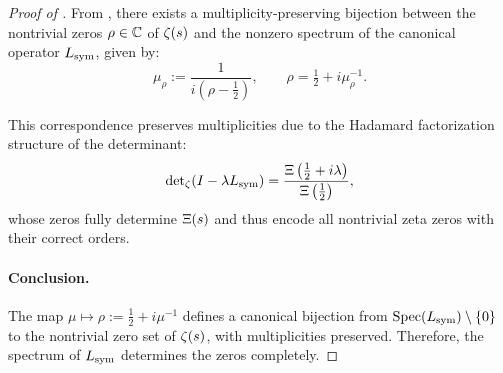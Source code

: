 \begin{proof}[Proof of ]
From , there exists a multiplicity-preserving bijection between the nontrivial zeros \( \rho \in \mathbb{C} \) of \( \zeta(s) \) and the nonzero spectrum of the canonical operator \( L_{\mathrm{sym}} \), given by:
\[
\mu_\rho := \frac{1}{i(\rho - \tfrac{1}{2})}, \qquad
\rho = \tfrac{1}{2} + i \mu_\rho^{-1}.
\]

This correspondence preserves multiplicities due to the Hadamard factorization structure of the determinant:
\[
\det\nolimits_\zeta(I - \lambda L_{\mathrm{sym}}) = \frac{\Xi\left( \tfrac{1}{2} + i\lambda \right)}{\Xi\left( \tfrac{1}{2} \right)},
\]
whose zeros fully determine \( \Xi(s) \) and thus encode all nontrivial zeta zeros with their correct orders.

\paragraph{Conclusion.}
The map \( \mu \mapsto \rho := \tfrac{1}{2} + i \mu^{-1} \) defines a canonical bijection from \( \operatorname{Spec}(L_{\mathrm{sym}}) \setminus \{0\} \) to the nontrivial zero set of \( \zeta(s) \), with multiplicities preserved. Therefore, the spectrum of \( L_{\mathrm{sym}} \) determines the zeros completely.
\end{proof}
